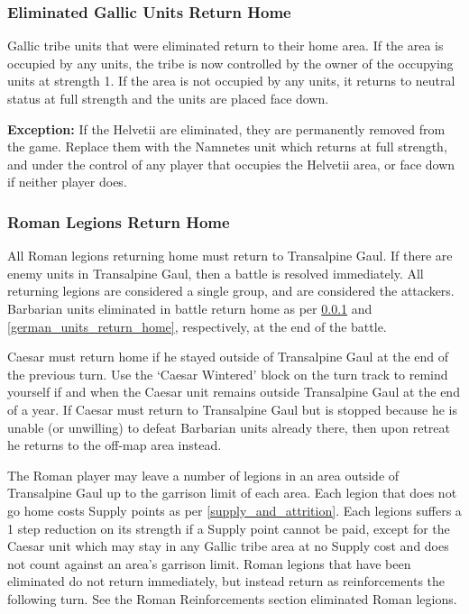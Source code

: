 \subsubsection{Eliminated Gallic Units Return Home}
\label{eliminated_gallic_units_return_home}
\par
Gallic tribe units that were eliminated return to their home area. If the area is occupied by any units, the tribe is now controlled by the owner of the occupying units at strength 1. If the area is not occupied by any units, it returns to neutral status at full strength and the units are placed face down.

\textbf{Exception:} If the Helvetii are eliminated, they are permanently removed from the game. Replace them with the Namnetes unit which returns at full strength, and under the control of any player that occupies the Helvetii area, or face down if neither player does.

\subsubsection{Roman Legions Return Home}
\par
All Roman legions returning home must return to Transalpine Gaul. If there are enemy units in Transalpine Gaul, then a battle is resolved immediately. All returning legions are considered a single group, and are considered the attackers. Barbarian units eliminated in battle return home as per \ref{eliminated_gallic_units_return_home} and \ref{german_units_return_home}, respectively, at the end of the battle.

Caesar must return home if he stayed outside of Transalpine Gaul at the end of the previous turn. Use the ‘Caesar Wintered’ block on the turn track to remind yourself if and when the Caesar unit remains outside Transalpine Gaul at the end of a year. If Caesar must return to Transalpine Gaul but is stopped because he is unable (or unwilling) to defeat Barbarian units already there, then upon retreat he returns to the off-map area instead.

The Roman player may leave a number of legions in an area outside of Transalpine Gaul up to the garrison limit of each area. Each legion that does not go home costs Supply points as per \ref{supply_and_attrition}. Each legions suffers a 1 step reduction on its strength if a Supply point cannot be paid, except for the Caesar unit which may stay in any Gallic tribe area at no Supply cost and does not count against an area's garrison limit. Roman legions that have been eliminated do not return immediately, but instead return as reinforcements the following turn. See the Roman Reinforcements section eliminated Roman legions.

